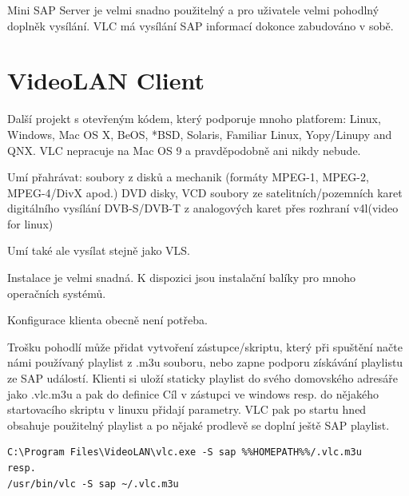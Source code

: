 \vspace{10pt}

Mini SAP Server je velmi snadno použitelný a pro uživatele velmi pohodlný doplněk vysílání. VLC má vysílání SAP informací dokonce zabudováno v sobě. 

\vspace{10pt}

\section{VideoLAN Client}

Další projekt s otevřeným kódem, který podporuje mnoho platforem: Linux, Windows, Mac OS X, BeOS, *BSD, Solaris, Familiar Linux, Yopy/Linupy and QNX. VLC nepracuje na Mac OS 9 a pravděpodobně ani nikdy nebude.

\vspace{10pt}

Umí přahrávat:
soubory z disků a mechanik (formáty MPEG-1, MPEG-2, MPEG-4/DivX apod.)
DVD disky, VCD soubory
ze satelitních/pozemních karet digitálního vysílání DVB-S/DVB-T
z analogových karet přes rozhraní v4l(video for linux)

\vspace{10pt}

Umí také ale vysílat stejně jako VLS.

\vspace{10pt}

Instalace je velmi snadná. K dispozici jsou instalační balíky pro mnoho operačních systémů.

\vspace{10pt}

Konfigurace klienta obecně není potřeba. 

\vspace{10pt}

Trošku pohodlí může přidat vytvoření zástupce/skriptu, který při spuštění načte námi používaný playlist z .m3u souboru, nebo zapne podporu získávání playlistu ze SAP událostí. Klienti si uloží staticky playlist do svého domovského adresáře jako .vlc.m3u a pak do definice Cíl v zástupci ve windows resp. do nějakého startovacího skriptu v linuxu přidají parametry. VLC pak po startu hned obsahuje použitelný playlist a po nějaké prodlevě se doplní ještě SAP playlist.

\vspace{10pt}

\begin{small}
\begin{verbatim}
C:\Program Files\VideoLAN\vlc.exe -S sap %%HOMEPATH%%/.vlc.m3u
resp.
/usr/bin/vlc -S sap ~/.vlc.m3u
\end{verbatim}
\end{small}

